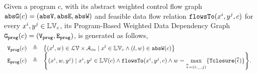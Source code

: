 \begin{defn}
  \label{def:prog_graph}
Given a program $c$, with its abstract weighted control flow graph $\mathtt{abs}{\mathtt{G}}(c) = (\mathtt{abs}{\mathtt{V}}, \mathtt{abs}{\mathtt{E}}, \mathtt{abs}{\mathtt{W}})$ and 
feasible data flow relation $\mathtt{flowsTo}(x^i, y^j, c)$ for every $x^i, y^j \in \mathbb{LV}_c$, its Program-Based Weighted Data Dependency Graph
$\mathtt{{G_{prog}}}(c) = (\mathtt{{V_{prog}}}, \mathtt{{E_{prog}}})$,
is generated as follows,
{\footnotesize
\[
\begin{array}{lcl}
\progV(c) & \triangleq &
\left\{ (x^l, w) \in  \mathcal{LV} \times \mathcal{A}_{in}
\mid
x^l \in \lvar_{{c}} \land (l, w) \in \absW(c)
\right\}
\\
\progE(c) & \triangleq &
   \left\{ (x^i, w, y^j) 
\mid
x^i, y^j \in \lvar(c) \land \flowsto(x^i, y^j, c) \land
w = \max\limits_{\absevent = (i, \_, j)} \{ \absclr(\absevent)\} 
\right\}.
\end{array}
\] }
\end{defn}
